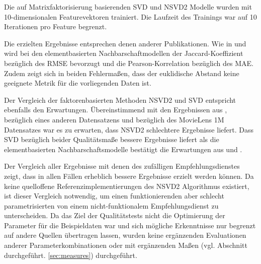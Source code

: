 Die auf Matrixfaktorisierung basierenden SVD und NSVD2 Modelle wurden mit 10-dimensionalen Featurevektoren trainiert. Die Laufzeit des Trainings war auf 10 Iterationen pro Feature begrenzt.

Die erzielten Ergebnisse entsprechen denen anderer Publikationen. Wie in \citep{Herlocker:1999:AFP:312624.312682} und \citep{Candillier:2008} wird bei den elementbasierten Nachbarschaftmodellen der Jaccard-Koeffizient bezüglich des \acs{RMSE} bevorzugt und die Pearson-Korrelation bezüglich des \acs{MAE}. Zudem zeigt sich in beiden Fehlermaßen, dass der euklidische Abstand keine geeignete Metrik für die vorliegenden Daten ist.


Der Vergleich der faktorenbasierten Methoden NSVD2 und SVD entspricht ebenfalls den Erwartungen. Übereinstimmend mit den Ergebnissen aus \citep{Paterek07}, bezüglich eines anderen Datensatzens und \citep{Cacheda2011} bezüglich des MovieLens 1M Datensatzes war es zu erwarten, dass NSVD2 schlechtere Ergebnisse liefert. Dass SVD bezüglich beider Qualitätsmaße bessere Ergebnisse liefert als die elementbasierten Nachbarschaftsmodelle bestätigt die Erwartungen aus \citep{Cacheda2011} und \citep{Koren:2009:MFT:1608565.1608614}.


Der Vergleich aller Ergebnisse mit denen des zufälligen Empfehlungsdienstes zeigt, dass in allen Fällen erheblich bessere Ergebnisse erzielt werden können. Da keine quelloffene Referenzimplementierungen des NSVD2 Algorithmus existiert, ist dieser Vergleich notwendig, um einen funktionierenden aber schlecht parametrisierten von einem nicht-funktionalem Empfehlungsdienst zu unterscheiden. Da das Ziel der Qualitätstests nicht die Optimierung der Parameter für die Beispieldaten war und sich mögliche Erkenntnisse nur begrenzt auf andere Quellen übertragen lassen, wurden keine ergänzenden Evaluationen anderer Parameterkombinationen oder mit ergänzenden Maßen (vgl. Abschnitt  durchgeführt. \ref{sec:measures}) durchgeführt.

